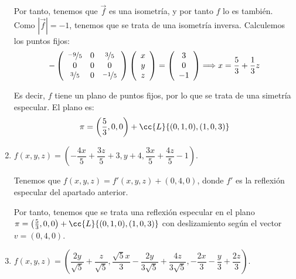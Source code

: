 \begin{ejercicio}
\begin{enumerate}
        Por tanto, tenemos que $\vec{f}$ es una isometría, y por tanto $f$ lo es también. Como $\left|\vec{f}\right|=-1$, tenemos que se trata de una isometría inversa. Calculemos los puntos fijos:
        \begin{equation*}
            -\left(
            \begin{array}{ccc}
                \nicefrac{-9}{5} & 0 & \nicefrac{3}{5} \\
                0 & 0 & 0 \\
                \nicefrac{3}{5} & 0 & \nicefrac{-1}{5} 
            \end{array}
            \right)
            \left(
            \begin{array}{c}
                x \\ y \\ z
            \end{array}
            \right)
            = \left(
            \begin{array}{c}
                3 \\ 0 \\ -1
            \end{array}
            \right) \Longrightarrow x=\frac{5}{3} + \frac{1}{3}z
        \end{equation*}

        Es decir, $f$ tiene un plano de puntos fijos, por lo que se trata de una simetría especular. El plano es:
        \begin{equation*}
            \pi = \left(\frac{5}{3}, 0, 0\right) + \cc{L}\{(0,1,0), (1,0,3)\}
        \end{equation*}

        
        \item $f\left(x, y, z\right) = \left(-\dfrac{4x}{5} + \dfrac{3z}{5} + 3, y + 4, \dfrac{3x}{5} + \dfrac{4z}{5} - 1\right)$.

        Tenemos que $f(x,y,z)=f'(x,y,z) + (0,4,0)$, donde $f'$ es la reflexión especular del apartado anterior.

        Por tanto, tenemos que se trata una reflexión especular en el plano $\pi = \left(\frac{5}{3}, 0, 0\right) + \cc{L}\{(0,1,0), (1,0,3)\}$ con deslizamiento según el vector $v=(0,4,0)$.
        
        \item $f\left(x, y, z\right) = \left(\dfrac{2y}{\sqrt{5}} + \dfrac{z}{\sqrt{5}},\dfrac{\sqrt{5}x}{3} - \dfrac{2y}{3\sqrt{5}} + \dfrac{4z}{3\sqrt{5}}, -\dfrac{2x}{3} - \dfrac{y}{3} + \dfrac{2z}{3}\right)$.


\end{enumerate}
\end{ejercicio}

